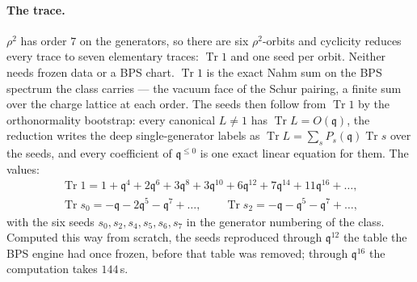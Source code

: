 \documentclass[11pt]{amsart}
\DeclareMathOperator{\Tr}{Tr}
\newcommand\fq{\mathfrak{q}}
\theoremstyle{remark}
\begin{document}
\paragraph{The trace.}  $\rho^2$ has order $7$ on the generators, so there are
six $\rho^2$-orbits and cyclicity reduces every trace to seven elementary
traces: $\Tr1$ and one seed per orbit.  Neither needs frozen data or a BPS
chart.  $\Tr1$ is the exact Nahm sum on the BPS spectrum the class carries
--- the vacuum face of the Schur pairing, a finite sum over the charge
lattice at each order.  The seeds then follow from $\Tr1$ by the
orthonormality bootstrap: every canonical $L\ne1$ has $\Tr L=O(\fq)$, the
reduction writes the deep single-generator labels as
$\Tr L=\sum_sP_s(\fq)\Tr s$ over the seeds, and every coefficient of
$\fq^{\le0}$ is one exact linear equation for them.  The values:
\begin{equation}\label{eq:comp-e6-traces}
\begin{gathered}
  \Tr1=1+\fq^4+2\fq^6+3\fq^8+3\fq^{10}+6\fq^{12}+7\fq^{14}+11\fq^{16}+\dots,\\
  \Tr s_0=-\fq-2\fq^5-\fq^7+\dots,\qquad
  \Tr s_2=-\fq-\fq^5-\fq^7+\dots,
\end{gathered}
\end{equation}
with the six seeds $s_0,s_2,s_4,s_5,s_6,s_7$ in the generator numbering of
the class.  Computed this way from scratch, the seeds reproduced through
$\fq^{12}$ the table the BPS engine had once frozen, before that table was
removed; through $\fq^{16}$ the computation takes $144$\,s.
\end{document}
